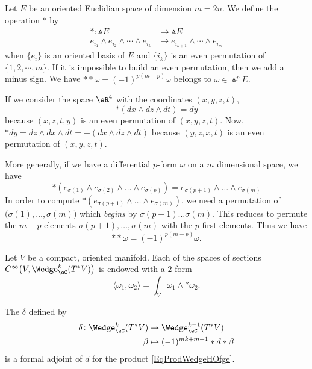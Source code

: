 Let $E$ be an oriented Euclidian space of dimension $m=2n$. We define the operation $*$ by
\begin{equation}		\label{EqGradWedge}
	\begin{aligned}
		*\colon \Wedge E&\to \Wedge E \\
		e_{i_1}\wedge e_{i_2}\wedge\cdots\wedge e_{i_k}&\mapsto e_{i_{k+1}}\wedge\cdots\wedge e_{i_m} 
	\end{aligned}
\end{equation}
when $\{ e_i \}$ is an oriented basis of $E$ and $\{ i_k \}$ is an even permutation of $\{ 1,2,\cdots,m \}$. If it is impossible to build an even permutation, then we add a minus sign. We have $**\omega=(-1)^{p(m-p)}\omega$ belongs to $\omega\in\Wedge^pE$.

\begin{example}
	If we consider the space $\eR^4$ with the coordinates $(x,y,z,t)$,
	\begin{equation}
		*(dx\wedge dz\wedge dt)=dy
	\end{equation}
	because $(x,z,t,y)$ is an even permutation of $(x,y,z,t)$. Now, $*dy=dz\wedge dx\wedge dt=-(dx\wedge dz\wedge dt)$ because $(y,z,x,t)$ is an even permutation of $(x,y,z,t)$.

	More generally, if we have a differential $p$-form $\omega$ on a $m$ dimensional space, we have
	\begin{equation}
		*(e_{\sigma(1)}\wedge e_{\sigma(2)}\wedge\ldots\wedge e_{\sigma(p)})=e_{\sigma(p+1)}\wedge \ldots\wedge e_{\sigma(m)}
	\end{equation}
	In order to compute $*(e_{\sigma(p+1)}\wedge \ldots\wedge e_{\sigma(m)})$, we need a permutation of $\big( \sigma(1),\ldots, \sigma(m)\big)$ which \emph{begins} by $\sigma(p+1)\ldots\sigma(m)$. This reduces to permute the $m-p$ elements $\sigma(p+1),\ldots,\sigma(m)$ with the $p$ first elements. Thus we have
	\begin{equation}
		**\omega=(-1)^{p(m-p)}\omega.
	\end{equation}
\end{example}

Let $V$ be a compact, oriented manifold. Each of the spaces of sections $ C^{\infty}\big( V, \Wedge^k_{\eC}(T^*V)\big)$ is endowed with a $2$-form
\begin{equation}		\label{EqProdWedgeHOfge}
	\langle \omega_1, \omega_2\rangle =\int_V\omega_1\wedge *\omega_2.
\end{equation}

\begin{lemma}
	The  $\delta$ defined by
	\begin{equation}
		\begin{aligned}[]
			\delta	\colon \Wedge^k_{\eC}(T^*V)&\to \Wedge_{\eC}^{k-1}(T^*V)\\
			\beta				&\mapsto (-1)^{mk+m+1}*d*\beta
		\end{aligned}
	\end{equation}
	is a formal adjoint of $d$ for the product \eqref{EqProdWedgeHOfge}.
\end{lemma}


